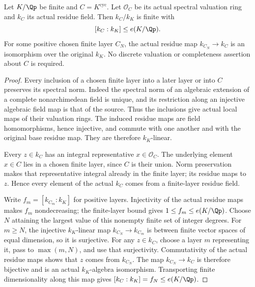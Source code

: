 \begin{lemma}
\label{ft:cyclotomic-infinite-residue-bound}

\leanok
Let $K/\Qp$ be finite and $C=K^{\mathrm{cyc}}$.
Let $\mathcal O_C$ be its actual spectral valuation ring and
$k_C$ its actual residue field. Then $k_C/k_K$ is finite with
\[
 [k_C:k_K]\leq e(K/\Qp).
\]
For some positive chosen finite layer $C_N$, the actual residue
map $k_{C_N}\to k_C$ is an isomorphism over the original $k_K$.
No discrete valuation or completeness assertion about $C$ is required.
\end{lemma}
\begin{proof}
Every inclusion of a chosen finite layer into a later layer or into
$C$ preserves its spectral norm. Indeed the spectral norm of an
algebraic extension of a complete nonarchimedean field is unique,
and its restriction along an injective algebraic field map is that
of the source. Thus the inclusions give actual local maps of their
valuation rings. The induced residue maps are field homomorphisms,
hence injective, and commute with one another and with the original
base residue map. They are therefore $k_K$-linear.

Every $z\in k_C$ has an integral representative $x\in\mathcal O_C$.
The underlying element $x\in C$ lies in a chosen finite layer,
since $C$ is their union. Norm preservation makes that representative
integral already in the finite layer; its residue maps to $z$.
Hence every element of the actual $k_C$ comes from a finite-layer
residue field.

Write $f_m=[k_{C_m}:k_K]$ for positive layers. Injectivity of the
actual residue maps makes $f_m$ nondecreasing; the finite-layer
bound gives $1\leq f_m\leq e(K/\Qp)$. Choose $N$ attaining the
largest value of this nonempty finite set of integer degrees.
For $m\geq N$, the injective $k_K$-linear map
$k_{C_N}\to k_{C_m}$ is between finite vector spaces of equal
dimension, so it is surjective. For any $z\in k_C$, choose a layer
$m$ representing it, pass to $\max(m,N)$, and use that surjectivity.
Commutativity of the actual residue maps shows that $z$ comes from
$k_{C_N}$. The map $k_{C_N}\to k_C$ is therefore bijective and
is an actual $k_K$-algebra isomorphism. Transporting finite
dimensionality along this map gives
$[k_C:k_K]=f_N\leq e(K/\Qp)$.
\end{proof}

